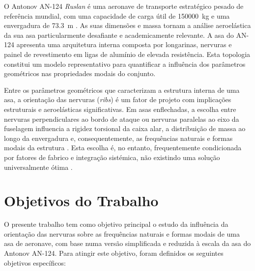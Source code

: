 \documentclass[11pt,oneside,a4paper,final]{report}
\begin{document}
O Antonov AN-124 \textit{Ruslan} é uma aeronave de transporte estratégico pesado de referência mundial, com uma capacidade de carga útil de \SI{150000}{\kilo\gram} e uma envergadura de \SI{73.3}{\meter} \cite{Gordon2008}. As suas dimensões e massa tornam a análise aeroelástica da sua asa particularmente desafiante e academicamente relevante. A asa do AN-124 apresenta uma arquitetura interna composta por longarinas, nervuras e painel de revestimento em ligas de alumínio de elevada resistência. Esta topologia constitui um modelo representativo para quantificar a influência dos parâmetros geométricos nas propriedades modais do conjunto.

Entre os parâmetros geométricos que caracterizam a estrutura interna de uma asa, a orientação das nervuras (\textit{ribs}) é um fator de projeto com implicações estruturais e aeroelásticas significativas. Em asas enflechadas, a escolha entre nervuras perpendiculares ao bordo de ataque ou nervuras paralelas ao eixo da fuselagem influencia a rigidez torsional da caixa alar, a distribuição de massa ao longo da envergadura e, consequentemente, as frequências naturais e formas modais da estrutura \cite{Niu1988, Megson2012}. Esta escolha é, no entanto, frequentemente condicionada por fatores de fabrico e integração sistémica, não existindo uma solução universalmente ótima \cite{Raymer2018}.

\section{Objetivos do Trabalho}

O presente trabalho tem como objetivo principal o estudo da influência da orientação das nervuras sobre as frequências naturais e formas modais de uma asa de aeronave, com base numa versão simplificada e reduzida à escala da asa do Antonov AN-124. Para atingir este objetivo, foram definidos os seguintes objetivos específicos:
\end{document}
